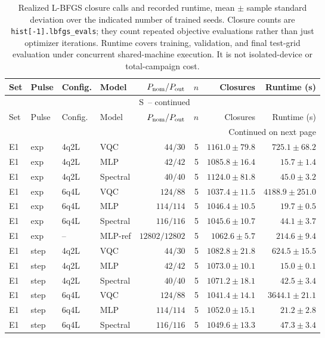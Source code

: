 \documentclass[11pt]{article}
\renewcommand{\thetable}{S\arabic{table}}
\begin{document}
\begingroup
\scriptsize
\setlength{\tabcolsep}{2.5pt}
\setlength{\LTcapwidth}{\textwidth}
\begin{longtable}{llllrrrr}
\caption{Realized L-BFGS closure calls and recorded runtime, mean $\pm$ sample standard deviation over the indicated number of trained seeds. Closure counts are \texttt{hist[-1].lbfgs\_evals}; they count repeated objective evaluations rather than just optimizer iterations. Runtime covers training, validation, and final test-grid evaluation under concurrent shared-machine execution. It is not isolated-device or total-campaign cost.}\label{tab:closures}\\
\toprule
Set & Pulse & Config. & Model & $P_{\rm nom}/P_{\rm out}$ & $n$ & Closures & Runtime (s) \\
\midrule
\endfirsthead
\multicolumn{8}{c}{\tablename\ \thetable\ -- continued}\\
\toprule
Set & Pulse & Config. & Model & $P_{\rm nom}/P_{\rm out}$ & $n$ & Closures & Runtime (s) \\
\midrule
\endhead
\midrule
\multicolumn{8}{r}{Continued on next page}\\
\endfoot
\bottomrule
\endlastfoot
E1 & exp & 4q2L & VQC & $44/30$ & 5 & $1161.0\pm79.8$ & $725.1\pm68.2$ \\
E1 & exp & 4q2L & MLP & $42/42$ & 5 & $1085.8\pm16.4$ & $15.7\pm1.4$ \\
E1 & exp & 4q2L & Spectral & $40/40$ & 5 & $1124.0\pm81.8$ & $45.0\pm3.2$ \\
E1 & exp & 6q4L & VQC & $124/88$ & 5 & $1037.4\pm11.5$ & $4188.9\pm251.0$ \\
E1 & exp & 6q4L & MLP & $114/114$ & 5 & $1046.4\pm10.5$ & $19.7\pm0.5$ \\
E1 & exp & 6q4L & Spectral & $116/116$ & 5 & $1045.6\pm10.7$ & $44.1\pm3.7$ \\
E1 & exp & -- & MLP-ref & $12802/12802$ & 5 & $1062.6\pm5.7$ & $214.6\pm9.4$ \\
E1 & step & 4q2L & VQC & $44/30$ & 5 & $1082.8\pm21.8$ & $624.5\pm15.5$ \\
E1 & step & 4q2L & MLP & $42/42$ & 5 & $1073.0\pm10.1$ & $15.0\pm0.1$ \\
E1 & step & 4q2L & Spectral & $40/40$ & 5 & $1071.2\pm18.1$ & $42.5\pm3.4$ \\
E1 & step & 6q4L & VQC & $124/88$ & 5 & $1041.4\pm14.1$ & $3644.1\pm21.1$ \\
E1 & step & 6q4L & MLP & $114/114$ & 5 & $1052.0\pm15.1$ & $21.2\pm2.8$ \\
E1 & step & 6q4L & Spectral & $116/116$ & 5 & $1049.6\pm13.3$ & $47.3\pm3.4$ \\

\end{longtable}
\end{document}
